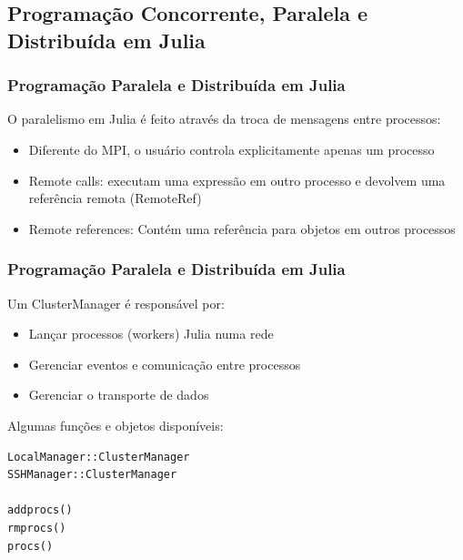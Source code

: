 \documentclass[10pt, compress]{beamer}
\begin{document}
\subsection{Programação Concorrente, Paralela e Distribuída em Julia}

\begin{frame}[fragile]
    \frametitle{Programação Paralela e Distribuída em Julia}
    O paralelismo em Julia é feito através da troca de mensagens
    entre processos:
    \begin{itemize}
        \item Diferente do MPI, o usuário controla
            explicitamente \alert{apenas um processo}
            \pause
        \item \alert{Remote calls}: executam uma \alert{expressão} em
            outro processo e devolvem uma referência remota (\alert{RemoteRef})
            \pause
        \item \alert{Remote references}: Contém uma referência para objetos
            em \alert{outros processos}
    \end{itemize}
    \let\thefootnote\relax{}
    \let\thefootnote\relax{}
\end{frame}

\begin{frame}[fragile]
    \frametitle{Programação Paralela e Distribuída em Julia}
    Um \alert{ClusterManager} é responsável por:
    \begin{itemize}
        \item Lançar processos (\alert{workers}) Julia numa rede
            \pause
        \item Gerenciar \alert{eventos} e \alert{comunicação}
            entre processos
            \pause
        \item Gerenciar o \alert{transporte} de dados
    \end{itemize}
    \pause
    Algumas funções e objetos disponíveis:
    \begin{lstlisting}
LocalManager::ClusterManager
SSHManager::ClusterManager

addprocs()
rmprocs()
procs()
    \end{lstlisting}
    \let\thefootnote\relax{}
    \let\thefootnote\relax{}
\end{frame}
\end{document}
